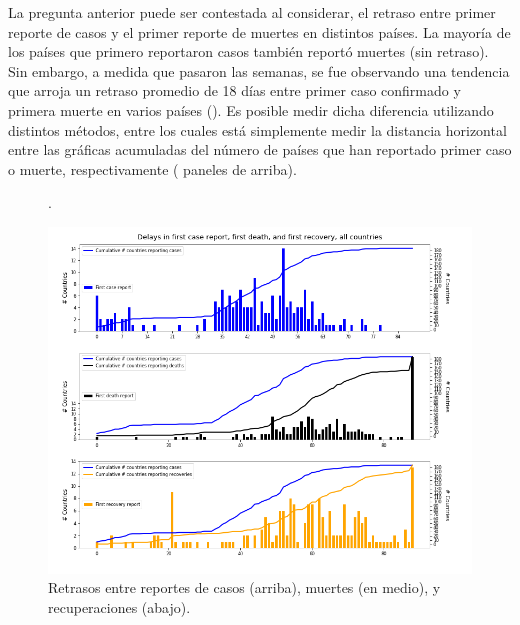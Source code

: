 La pregunta anterior puede ser contestada al considerar, el retraso entre primer reporte de casos y el primer reporte de muertes en distintos países. La mayoría de los países que primero reportaron casos también reportó muertes (sin retraso). Sin embargo, a medida que pasaron las semanas, se fue observando una tendencia que arroja un retraso promedio de 18 días entre primer caso confirmado y primera muerte en varios países (). Es posible medir dicha diferencia utilizando distintos métodos, entre los cuales está simplemente medir la distancia horizontal entre las gráficas acumuladas del número de países que han reportado primer caso o muerte, respectivamente ( paneles de arriba). 
%
\begin{figure}[h]
\caption{Retrasos entre reportes de casos (arriba), muertes (en medio), y recuperaciones (abajo). }. \label{fig:reportArrivals}
\begin{minipage}{0.6\textwidth}
\includegraphics[width=\textwidth]{../tsam_Covid19_analysis/figures/tsam_Covid19_JHU_reportArrivals_AllCountries}
\end{minipage}%
\begin{minipage}{0.4\textwidth}

\end{minipage}
\end{figure}

